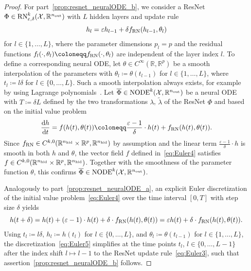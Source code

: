 \documentclass[10pt]{article}
\theoremstyle{definition}
\numberwithin{equation}{section}
\newcommand{\eps}{\varepsilon}
\newcommand{\R}{\mathbb{R}}
\newcommand*{\dd}{\mathrm{d}}
\newcommand*{\nout}{n_\textup{out}}
\newcommand*{\nhid}{n_\textup{hid}}
\newcommand*{\RN}{\textup{RN}_{\eps,\delta}^k(\mathcal{X},\R^{\nout})}
\newcommand*{\NODE}{\textup{NODE}^k(\mathcal{X},\R^{\nout})}
\begin{document}
\begin{proof}
    For part~\ref{prop:resnet_neuralODE_b}, we consider a ResNet $\Phi \in \RN$ with $L$ hidden layers and update rule
    \begin{equation}  \label{eq:Euler3} 
        h_{l} = \eps h_{l-1} + \delta f_\textup{RN}(h_{l-1},\theta_{l})
    \end{equation}
    for $l \in \{1, \ldots, L\}$, where the parameter dimensions $p_l = p$ and the residual functions $f_l(\cdot,\theta_l) \coloneqq f_\textup{RN}(\cdot,\theta_l)$ are independent of the layer index $l$. To define a corresponding neural ODE, let $\theta\in C^\infty(\R,\R^p)$ be a smooth interpolation of the parameters with $\theta_l \coloneqq \theta(t_{l-1})$ for $l \in \{1,\ldots,L\}$, where $t_l \coloneqq l \delta$ for $l \in \{0,\ldots,L\}$. Such a smooth interpolation always exists, for example by using Lagrange polynomials~\cite{Humpherys2020}. Let $\overline{\Phi} \in \NODE$ be a neural ODE with $T \coloneqq \delta L$ defined by the two transformations $\lambda$, $\tilde{\lambda}$ of the ResNet $\Phi$ and based on the initial value problem 
    \begin{equation}\label{eq:Euler4} 
        \frac{\dd h}{\dd t} = f(h(t),\theta(t)) \coloneqq \frac{\eps-1}{\delta}\cdot h(t) + f_\textup{RN}(h(t),\theta(t)).
    \end{equation}
    Since $f_\textup{RN}\in C^{k,0}(\R^{\nhid}\times\R^p,\R^{\nhid})$ by assumption and the linear term $\frac{\eps-1}{\delta}\cdot h$ is smooth in both $h$ and $\theta$, the vector field $f$ defined in~\eqref{eq:Euler4} satisfies $f\in C^{k,0}(\R^{\nhid}\times\R^p,\R^{\nhid})$. Together with the smoothness of the parameter function $\theta$, this confirms $\overline{\Phi}\in\NODE$.
    
    Analogously to part~\ref{prop:resnet_neuralODE_a}, an explicit Euler discretization of the initial value problem~\eqref{eq:Euler4} over the time interval $[0,T]$ with step size $\delta$ yields
    \begin{equation}\label{eq:Euler5}
        h(t + \delta) = h(t) + (\eps-1)\cdot h(t) + \delta \cdot f_\textup{RN}(h(t),\theta(t)) = \eps h(t) + \delta \cdot f_\textup{RN}(h(t),\theta(t)).
    \end{equation}
    Using $t_l \coloneqq l \delta$, $h_l \coloneqq h(t_l)$ for $l \in \{0,\ldots,L\}$, and $\theta_l \coloneqq \theta(t_{l-1})$ for $l \in \{1,\ldots, L\}$, the discretization~\eqref{eq:Euler5} simplifies at the time points $t_l$, $l \in \{0,\ldots,L-1\}$ after the index shift $l \mapsto l-1$ to the ResNet update rule~\eqref{eq:Euler3}, such that assertion~\ref{prop:resnet_neuralODE_b} follows. 
\end{proof}
\end{document}
